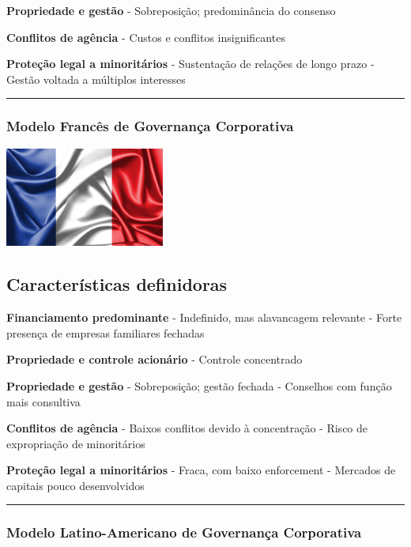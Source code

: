 \documentclass[
]{book}
\begin{document}
\textbf{Propriedade e gestão} - Sobreposição; predominância do consenso

\textbf{Conflitos de agência} - Custos e conflitos insignificantes

\textbf{Proteção legal a minoritários} - Sustentação de relações de longo prazo - Gestão voltada a múltiplos interesses

\begin{center}\rule{0.5\linewidth}{0.5pt}\end{center}

\subsubsection{Modelo Francês de Governança Corporativa}\label{modelo-francuxeas-de-governanuxe7a-corporativa}

\includegraphics[width=2.0625in,height=\textheight]{images/02-2025-08-12_13/08-modelo_frances.jpg}

\subsection{Características definidoras}\label{caracteruxedsticas-definidoras-3}

\textbf{Financiamento predominante} - Indefinido, mas alavancagem relevante - Forte presença de empresas familiares fechadas

\textbf{Propriedade e controle acionário} - Controle concentrado

\textbf{Propriedade e gestão} - Sobreposição; gestão fechada - Conselhos com função mais consultiva

\textbf{Conflitos de agência} - Baixos conflitos devido à concentração - Risco de expropriação de minoritários

\textbf{Proteção legal a minoritários} - Fraca, com baixo enforcement - Mercados de capitais pouco desenvolvidos

\begin{center}\rule{0.5\linewidth}{0.5pt}\end{center}

\subsubsection{Modelo Latino-Americano de Governança Corporativa}\label{modelo-latino-americano-de-governanuxe7a-corporativa}
\end{document}
